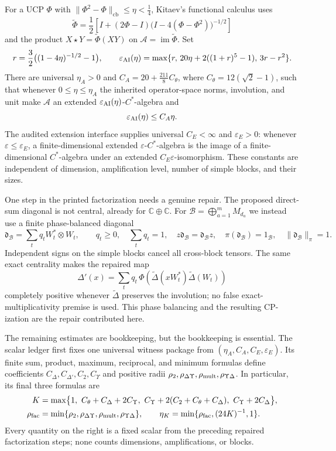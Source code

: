 \documentclass[10pt]{article}
\newcommand{\cb}{\mathrm{cb}}
\newcommand{\C}{\mathbb C}
\newcommand{\norm}[1]{\lVert #1\rVert}
\begin{document}
For a UCP $\Phi$ with $\norm{\Phi^2-\Phi}_{\cb}\leq\eta<\tfrac14$, Kitaev's
functional calculus uses
\[
 \widetilde\Phi=\frac12\left[I+(2\Phi-I)
       \bigl(I-4(\Phi-\Phi^2)\bigr)^{-1/2}\right]
\]
and the product $X\star Y=\widetilde\Phi(XY)$ on
$\mathcal A=\operatorname{im}\widetilde\Phi$.  Set
\[
 r=\frac32\bigl((1-4\eta)^{-1/2}-1\bigr),\qquad
 \varepsilon_{\rm AI}(\eta)
 =\max\{r,\,20\eta+2((1+r)^5-1),\,3r-r^2\}.
\]
There are universal $\eta_A>0$ and
$C_A=20+\frac{211}{8}C_\theta$, where $C_\theta=12(\sqrt2-1)$, such that
whenever $0\leq\eta\leq\eta_A$ the inherited operator-space norms,
involution, and unit make $\mathcal A$ an extended
$\varepsilon_{\rm AI}(\eta)$-$C^*$-algebra and
\[
 \varepsilon_{\rm AI}(\eta)\leq C_A\eta.
\]
The audited extension interface supplies universal $C_E<\infty$ and
$\varepsilon_E>0$: whenever $\varepsilon\leq\varepsilon_E$, a
finite-dimensional extended $\varepsilon$-$C^*$-algebra is the image of a
finite-dimensional $C^*$-algebra under an extended
$C_E\varepsilon$-isomorphism.  These constants are independent of dimension,
amplification level, number of simple blocks, and their sizes.

One step in the printed factorization needs a genuine repair.  The proposed
direct-sum diagonal is not central, already for $\C\oplus\C$.  For
$\mathcal B=\bigoplus_{a=1}^mM_{d_a}$ we instead use a finite phase-balanced
diagonal
\[
  \mathfrak d_{\mathcal B}=\sum_tq_tW_t^*\otimes W_t,\qquad
  q_t\geq0,\quad \sum_tq_t=1,\quad
  z\mathfrak d_{\mathcal B}=\mathfrak d_{\mathcal B}z,\quad
  \pi(\mathfrak d_{\mathcal B})=1_{\mathcal B},\quad
  \norm{\mathfrak d_{\mathcal B}}_\pi=1.
\]
Independent signs on the simple blocks cancel all cross-block tensors.  The
same exact centrality makes the repaired map
\[
 \Delta'(x)=\sum_tq_t\,\Phi\!\left(
   \widetilde\Delta(xW_t^*)\widetilde\Delta(W_t)\right)
\]
completely positive whenever $\widetilde\Delta$ preserves the involution;
no false exact-multiplicativity premise is used.  This phase balancing and
the resulting CP-ization are the repair contributed here.

The remaining estimates are bookkeeping, but the bookkeeping is essential.
The scalar ledger first fixes one universal witness package from
$(\eta_A,C_A,C_E,\varepsilon_E)$.  Its finite sum, product, maximum,
reciprocal, and minimum formulas define coefficients
$C_\Delta,C_{\Delta'},C_2,C_\Upsilon$ and positive radii
$\rho_2,\rho_{\Delta\Upsilon},\rho_{\rm mult},
\rho_{\Upsilon\Delta}$.  In particular, its final three formulas are
\begin{align}
 K&=\max\bigl\{1,\ C_\theta+C_\Delta+2C_\Upsilon,\
 C_\Upsilon+2(C_2+C_\theta+C_\Delta),\
 C_\Upsilon+2C_\Delta\bigr\},\label{eq:K}\\
 \rho_{\rm fac}&=\min\{\rho_2,\rho_{\Delta\Upsilon},
 \rho_{\rm mult},\rho_{\Upsilon\Delta}\},\qquad
 \eta_K=\min\{\rho_{\rm fac},(24K)^{-1},1\}.
 \label{eq:etaK}
\end{align}
Every quantity on the right is a fixed scalar from the preceding repaired
factorization steps; none counts dimensions, amplifications, or blocks.
\end{document}
